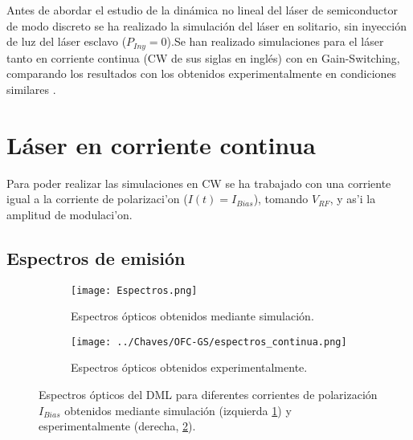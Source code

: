 \graphicspath{{../Graphics/Cpt1-Charactz/}}

Antes de abordar el estudio de la dinámica no lineal del láser de semiconductor de modo discreto se ha realizado la simulación del láser en solitario, sin inyección de luz del láser esclavo ($P_{Iny} = 0$).Se han realizado simulaciones para el láser tanto en corriente continua (CW de sus siglas en inglés) con en Gain-Switching, comparando los resultados con los obtenidos experimentalmente en condiciones similares \cite{Chaves19}.

	\section{Láser en corriente continua}

		Para poder realizar las simulaciones en CW se ha trabajado con una corriente igual a la corriente de polarizaci'on ($I(t) = I_{Bias}$), tomando $V_{RF}$, y as'i la amplitud de modulaci'on.

		\subsection{Espectros de emisión}

		
				\begin{figure}[H]
					\centering
					\begin{subfigure}{0.45\textwidth}
						\centering
						\texttt{[image: Espectros.png]}
						\caption{\label{Img:spectrosCW:sim}Espectros ópticos obtenidos mediante simulación.}
					\end{subfigure}
					\begin{subfigure}{0.45\textwidth}
						\centering
						\texttt{[image: ../Chaves/OFC-GS/espectros\_continua.png]}
						\caption{\label{Img:spectrosCW:exp}Espectros ópticos obtenidos experimentalmente.}	
					\end{subfigure}
					\caption{\label{Img:spectrosCW}Espectros ópticos del DML para diferentes corrientes de polarización $I_{Bias}$ obtenidos mediante simulación (izquierda \ref{Img:spectrosCW:sim}) y esperimentalmente (derecha, \ref{Img:spectrosCW:exp}).}
				\end{figure}
 
